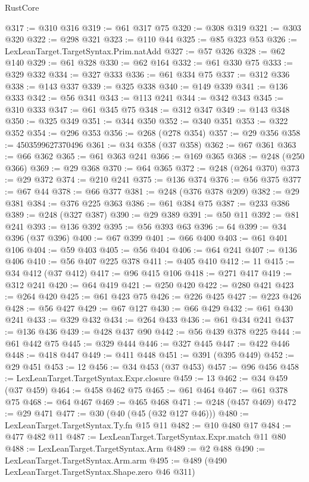 \begin{lexlean}{RustCore}
\begin{coremodule}
@317 := @310 @316
@319 := @61 @317 @75
@320 := @308 @319
@321 := @303 @320
@322 := @298 @321
@323 := @110 @44
@325 := @85 @323 @53
@326 := LexLeanTarget.TargetSyntax.Prim.natAdd
@327 := @57 @326
@328 := @62 @140
@329 := @61 @328
@330 := @62 @164
@332 := @61 @330 @75
@333 := @329 @332
@334 := @327 @333
@336 := @61 @334 @75
@337 := @312 @336
@338 := @143 @337
@339 := @325 @338
@340 := @149 @339
@341 := @136 @333
@342 := @56 @341
@343 := @113 @241
@344 := @342 @343
@345 := @310 @333
@347 := @61 @345 @75
@348 := @312 @347
@349 := @143 @348
@350 := @325 @349
@351 := @344 @350
@352 := @340 @351
@353 := @322 @352
@354 := @296 @353
@356 := @268 (@278 @354)
@357 := @29 @356
@358 := 4503599627370496
@361 := @34 @358 (@37 @358)
@362 := @67 @361
@363 := @66 @362
@365 := @61 @363 @241
@366 := @169 @365
@368 := @248 (@250 @366)
@369 := @29 @368
@370 := @64 @365
@372 := @248 (@264 @370)
@373 := @29 @372
@374 := @210 @241
@375 := @136 @374
@376 := @56 @375
@377 := @67 @44
@378 := @66 @377
@381 := @248 (@376 @378 @209)
@382 := @29 @381
@384 := @376 @225 @363
@386 := @61 @384 @75
@387 := @233 @386
@389 := @248 (@327 @387)
@390 := @29 @389
@391 := @50 @11
@392 := @81 @241
@393 := @136 @392
@395 := @56 @393 @63
@396 := 64
@399 := @34 @396 (@37 @396)
@400 := @67 @399
@401 := @66 @400
@403 := @61 @401 @106
@404 := @59 @403
@405 := @56 @404
@406 := @64 @241
@407 := @136 @406
@410 := @56 @407 @225 @378
@411 := @405 @410
@412 := 11
@415 := @34 @412 (@37 @412)
@417 := @96 @415 @106
@418 := @271 @417
@419 := @312 @241
@420 := @64 @419
@421 := @250 @420
@422 := @280 @421
@423 := @264 @420
@425 := @61 @423 @75
@426 := @226 @425
@427 := @223 @426
@428 := @56 @427
@429 := @67 @127
@430 := @66 @429
@432 := @61 @430 @241
@433 := @329 @432
@434 := @264 @433
@436 := @61 @434 @241
@437 := @136 @436
@439 := @428 @437 @90
@442 := @56 @439 @378 @225
@444 := @61 @442 @75
@445 := @329 @444
@446 := @327 @445
@447 := @422 @446
@448 := @418 @447
@449 := @411 @448
@451 := @391 (@395 @449)
@452 := @29 @451
@453 := 12
@456 := @34 @453 (@37 @453)
@457 := @96 @456
@458 := LexLeanTarget.TargetSyntax.Expr.closure
@459 := 13
@462 := @34 @459 (@37 @459)
@464 := @458 @462 @75
@465 := @61 @464
@467 := @61 @378 @75
@468 := @64 @467
@469 := @465 @468
@471 := @248 (@457 @469)
@472 := @29 @471
@477 := @30 (@40 (@45 (@32 @127 @46)))
@480 := LexLeanTarget.TargetSyntax.Ty.fn @15 @11
@482 := @10 @480 @17
@484 := @477 @482 @11
@487 := LexLeanTarget.TargetSyntax.Expr.match @11 @80
@488 := LexLeanTarget.TargetSyntax.Arm
@489 := @2 @488
@490 := LexLeanTarget.TargetSyntax.Arm.arm
@495 := @489 (@490 LexLeanTarget.TargetSyntax.Shape.zero @46 @311)

\end{coremodule}
\end{lexlean}
